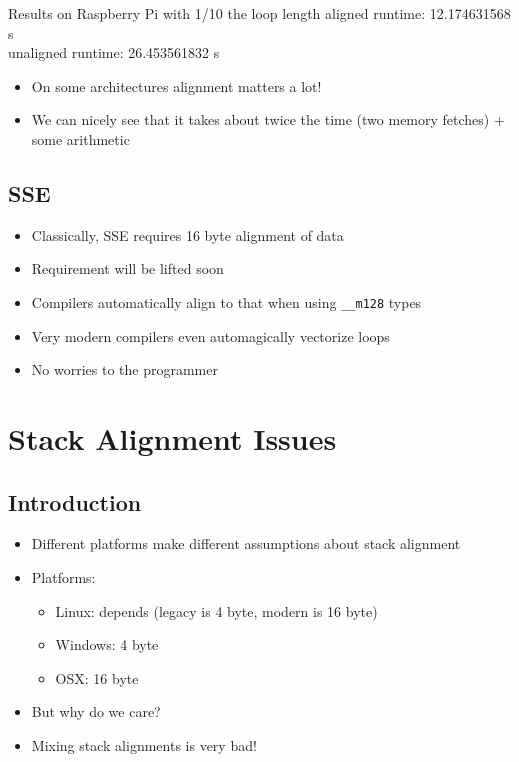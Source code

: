 \documentclass{beamer}
\begin{document}
\begin{frame}{\insertsection}{\insertsubsection}
    \begin{block}{Results on Raspberry Pi with 1/10 the loop length}
        aligned runtime: 12.174631568 s\\
        unaligned runtime: 26.453561832 s
    \end{block}
    \begin{itemize}
        \item On some architectures alignment matters a lot!
        \item We can nicely see that it takes about twice the time (two memory fetches) + some
            arithmetic
	\end{itemize}
\end{frame}

\subsection{SSE}
\begin{frame}[fragile]{\insertsection}{\insertsubsection}
    \begin{itemize}
        \item Classically, SSE requires 16 byte alignment of data
        \item Requirement will be lifted soon
        \item Compilers automatically align to that when using \verb|__m128| types
        \item Very modern compilers even automagically vectorize loops
        \item No worries to the programmer {\large\smiley}
    \end{itemize}
\end{frame}

\section{Stack Alignment Issues}
\subsection{Introduction}
\begin{frame}{\insertsection}{\insertsubsection}
    \begin{itemize}
        \item Different platforms make different assumptions about stack alignment
        \item Platforms:
            \begin{itemize}
                \item Linux: depends (legacy is 4 byte, modern is 16 byte)
                \item Windows: 4 byte
                \item OSX: 16 byte
            \end{itemize}
            \pause
        \item But why do we care? \pause
        \item Mixing stack alignments is very bad!
    \end{itemize}
\end{frame}
\end{document}
